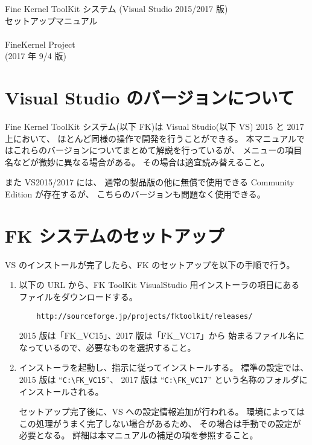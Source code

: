 \documentclass[a4j]{jarticle}
\begin{document}
\begin{center}
{\Large Fine Kernel ToolKit システム (Visual Studio 2015/2017 版) \\
	セットアップマニュアル} \\ ~ \\
{\Large FineKernel Project} \\
(2017 年 9/4 版)
\end{center}


\section{Visual Studio のバージョンについて}
Fine Kernel ToolKit システム(以下 FK)は 
Visual Studio(以下 VS) 2015 と 2017 上において、
ほとんど同様の操作で開発を行うことができる。
本マニュアルではこれらのバージョンについてまとめて解説を行っているが、
メニューの項目名などが微妙に異なる場合がある。
その場合は適宜読み替えること。

また VS2015/2017 には、
通常の製品版の他に無償で使用できる Community Edition が存在するが、
こちらのバージョンも問題なく使用できる。

\section{FK システムのセットアップ}
VS のインストールが完了したら、FK のセットアップを以下の手順で行う。

\begin{enumerate}
\item 以下の URL から、FK ToolKit VisualStudio 用インストーラの項目にある
ファイルをダウンロードする。

\begin{verbatim}
    http://sourceforge.jp/projects/fktoolkit/releases/
\end{verbatim}

2015 版は「FK\_VC15」、2017 版は「FK\_VC17」から
始まるファイル名になっているので、必要なものを選択すること。

\item インストーラを起動し、指示に従ってインストールする。
標準の設定では、2015 版は ``\verb+C:\FK_VC15+''、
2017 版は ``\verb+C:\FK_VC17+'' という名称のフォルダにインストールされる。

セットアップ完了後に、VS への設定情報追加が行われる。
環境によってはこの処理がうまく完了しない場合があるため、
その場合は手動での設定が必要となる。
詳細は本マニュアルの補足の項を参照すること。


\end{enumerate}
\end{document}
